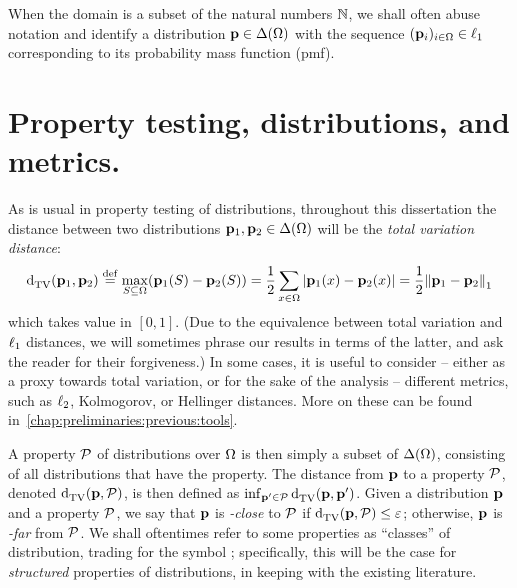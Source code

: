 When the domain is a subset of the natural numbers $\N$, we shall often abuse notation and identify a distribution $\p\in\distribs{\domain[\Omega]}$ with the sequence $(\p_i)_{i\in\domain}\in\lp[1]$ corresponding to its probability mass function (pmf).

\section{Property testing, distributions, and metrics.}\label{sec:preliminaries:basics}

As is usual in property testing of distributions, throughout this dissertation the distance between two distributions $\D_1, \D_2\in \distribs{\domain}$ will be the \emph{total variation distance}:
\begin{equation}\label{def:distance:tv}
\totalvardist{\D_1}{\D_2 } \eqdef \max_{S \subseteq \domain} (\D_1(S)-\D_2(S)) = \frac{1}{2} \sum_{x \in \domain}\abs{\D_1(x)-\D_2(x)} = \frac{1}{2} \normone{\D_1 - \D_2}
\end{equation}
which takes value in $[0,1]$. (Due to the equivalence between total variation and $\lp[1]$ distances, we will sometimes phrase our results in terms of the latter, and ask the reader for their forgiveness.) In some cases, it is useful to consider -- either as a proxy towards total variation, or for the sake of the analysis -- different metrics, such as $\lp[2]$, Kolmogorov, or Hellinger distances. More on these can be found in~\cref{chap:preliminaries:previous:tools}.

A property $\property$ of distributions over $\domain$ is then simply a subset of $\distribs{\domain}$, consisting of all distributions that have the property. The distance from $\D$ to a property $\property$, denoted $\totalvardist{\D}{\property}$, is then defined as $\inf_{\D^\prime \in \property} \totalvardist{\D}{\D^\prime}$. Given a distribution $\D$ and a property $\property$, we say that $\D$ is \emph{\eps-close} to $\property$ if $\totalvardist{\D}{\property}\leq \eps$; otherwise, $\D$ is \emph{\eps-far} from $\property$. We shall oftentimes refer to some properties as ``classes'' of distribution, trading \property for the symbol \class; specifically, this will be the case for \emph{structured} properties of distributions, in keeping with the existing literature.

